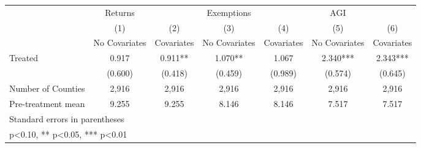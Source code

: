 {
\def\sym#1{\ifmmode^{#1}\else\(^{#1}\)\fi}
\begin{tabular}{l*{6}{c}}
\hline\hline
            &     Returns   &               &  Exemptions   &               &         AGI   &               \\
            &\multicolumn{1}{c}{(1)}&\multicolumn{1}{c}{(2)}&\multicolumn{1}{c}{(3)}&\multicolumn{1}{c}{(4)}&\multicolumn{1}{c}{(5)}&\multicolumn{1}{c}{(6)}\\
            &\multicolumn{1}{c}{No Covariates}&\multicolumn{1}{c}{Covariates}&\multicolumn{1}{c}{No Covariates}&\multicolumn{1}{c}{Covariates}&\multicolumn{1}{c}{No Covariates}&\multicolumn{1}{c}{Covariates}\\
\hline
Treated     &       0.917   &       0.911** &       1.070** &       1.067   &       2.340***&       2.343***\\
            &     (0.600)   &     (0.418)   &     (0.459)   &     (0.989)   &     (0.574)   &     (0.645)   \\
\hline
Number of Counties&       2,916   &       2,916   &       2,916   &       2,916   &       2,916   &       2,916   \\
Pre-treatment mean&       9.255   &       9.255   &       8.146   &       8.146   &       7.517   &       7.517   \\
\hline\hline
\multicolumn{7}{l}{\footnotesize Standard errors in parentheses}\\
\multicolumn{7}{l}{\footnotesize * p<0.10, ** p<0.05, *** p<0.01}\\
\end{tabular}
}
